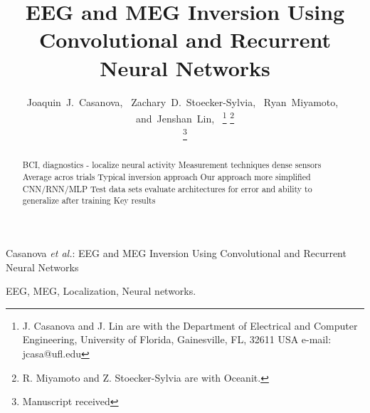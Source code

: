 \documentclass[journal]{IEEEtran}
\begin{document}

\title{EEG and MEG Inversion Using Convolutional and Recurrent Neural Networks}
%
%
%

\author{Joaquin~J.~Casanova,~
        Zachary~D.~Stoecker-Sylvia,~
        Ryan~Miyamoto,~
        and~Jenshan~Lin,~%
\thanks{J. Casanova and J. Lin are with the Department
of Electrical and Computer Engineering, University of Florida, Gainesville,
FL, 32611 USA e-mail: jcasa@ufl.edu}%
\thanks{R. Miyamoto and Z. Stoecker-Sylvia are with Oceanit.}%

\thanks{Manuscript received }}

%
{Casanova \MakeLowercase{\textit{et al.}}: EEG and MEG Inversion Using Convolutional and Recurrent Neural Networks}
\maketitle

\begin{abstract}

  BCI, diagnostics - localize neural activity
  Measurement techniques dense sensors
  Average acros trials
  Typical inversion approach
  Our approach more simplified CNN/RNN/MLP
  Test data sets
  evaluate architectures for error and ability to generalize after training
  Key results
  
\end{abstract}

\begin{IEEEkeywords}
EEG, MEG, Localization, Neural networks.
\end{IEEEkeywords}






%
\IEEEpeerreviewmaketitle
\end{document}
